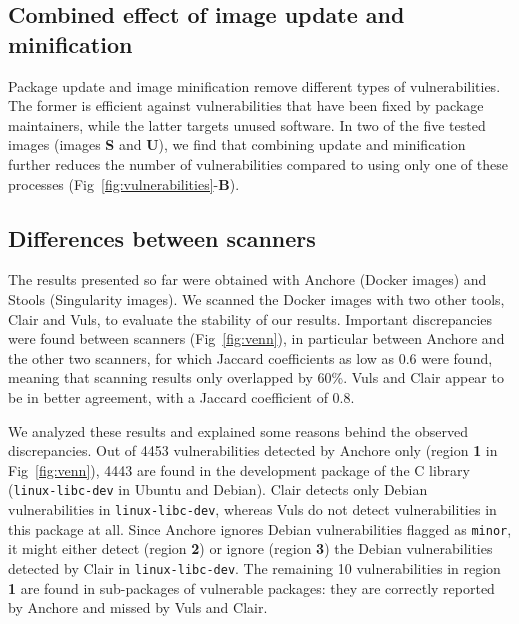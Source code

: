 \documentclass[a4paper,num-refs]{oup-contemporary}
\begin{document}
\subsection{Combined effect of image update and  minification}

Package update and image minification remove different types of
vulnerabilities. The former is efficient against vulnerabilities that have
been fixed by package maintainers, while the latter targets unused
software. In two of the five tested images (images \textbf{S} and \textbf{U}), we find that combining update
and minification further reduces the number of vulnerabilities compared to
using only one of these processes
(Fig~\ref{fig:vulnerabilities}-\textbf{B}). \

\subsection{Differences between scanners}

The results presented so far were obtained with Anchore (Docker images) and
Stools (Singularity images). We scanned the Docker images with two other tools,
Clair and Vuls, to evaluate the stability of our results. Important
discrepancies were found between scanners (Fig~\ref{fig:venn}), in
particular between Anchore and the other two scanners, for which Jaccard
coefficients as low as 0.6 were found, meaning that scanning results only
overlapped by 60\%. Vuls and Clair appear to be in better agreement, with a
Jaccard coefficient of 0.8.

We analyzed these results and explained some reasons behind the observed
discrepancies. Out of 4453 vulnerabilities detected by Anchore only (region
\textbf{1} in Fig~\ref{fig:venn}), 4443 are found in the development
package of the C library (\texttt{linux-libc-dev} in Ubuntu and Debian).
Clair detects only Debian vulnerabilities in \texttt{linux-libc-dev},
whereas Vuls do not detect vulnerabilities in this package at all. Since Anchore
ignores Debian
vulnerabilities flagged as \texttt{minor}, it
might either detect (region \textbf{2}) or ignore (region \textbf{3})
the
Debian vulnerabilities detected by Clair in \texttt{linux-libc-dev}. The
remaining 10 vulnerabilities in region \textbf{1} are found in sub-packages
of vulnerable packages: they are correctly reported by Anchore and missed
by Vuls and Clair. 
\end{document}
